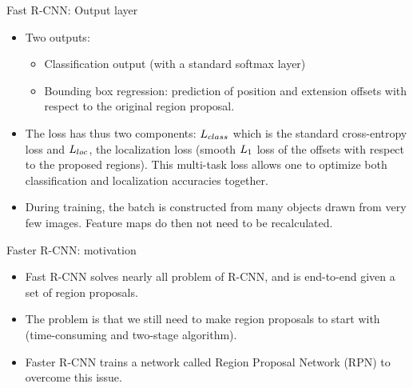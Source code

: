 \documentclass[xcolor=pdftex,dvipsnames,table]{beamer}
\begin{document}
\begin{frame}{Fast R-CNN: Output layer}
\begin{itemize}
\item Two outputs:
\begin{itemize}
	\item Classification output (with a standard softmax layer)
	\item Bounding box regression: prediction of position and extension offsets with respect to the original region proposal. 
\end{itemize}
\item The loss has thus two components: $L_{class}$ which is the standard cross-entropy loss and $L_{loc}$, the localization loss (smooth $L_1$ loss of the offsets with respect to the proposed regions). This multi-task loss allows one to optimize both classification and localization accuracies together. 
\item During training, the batch is constructed from many objects drawn from very few images. Feature maps do then not need to be recalculated. 
\end{itemize}
\end{frame}


\begin{frame}{Faster R-CNN: motivation}
\begin{itemize}
	\item Fast R-CNN solves nearly all problem of R-CNN, and is end-to-end given a set of region proposals.
	\item The problem is that we still need to make region proposals to start with (time-consuming and two-stage algorithm).
	\item Faster R-CNN \cite{Ren2017} trains a network called Region Proposal Network (RPN) to overcome this issue.
\end{itemize}
\end{frame}
\end{document}
